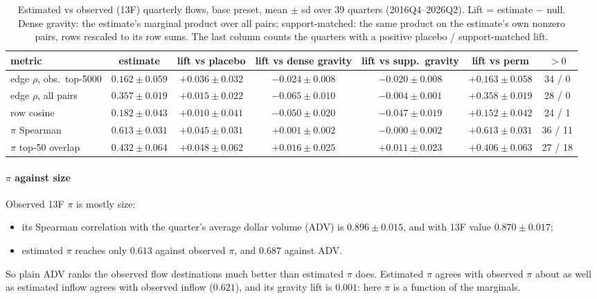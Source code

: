 \documentclass[preprint,3p,twocolumn]{elsarticle}
\begin{document}
\begin{table}[t]
\centering
\caption{Estimated vs observed (13F) quarterly flows, base preset, mean $\pm$ sd over 39 quarters (2016Q4--2026Q2). Lift = estimate $-$ null. Dense gravity: the estimate's marginal product over all pairs; support-matched: the same product on the estimate's own nonzero pairs, rows rescaled to its row sums. The last column counts the quarters with a positive placebo / support-matched lift.}
\label{Table:13f}
\footnotesize\setlength{\tabcolsep}{4pt}
\begin{tabular}{lcccccc}
\toprule
metric & estimate & lift vs placebo & lift vs dense gravity & lift vs supp.\ gravity & lift vs perm & $>0$ \\
\midrule
edge $\rho$, obs.\ top-5000 & $0.162\pm0.059$ & $+0.036\pm0.032$ & $-0.024\pm0.008$ & $-0.020\pm0.008$ & $+0.163\pm0.058$ & 34 / 0 \\
edge $\rho$, all pairs & $0.357\pm0.019$ & $+0.015\pm0.022$ & $-0.065\pm0.010$ & $-0.004\pm0.001$ & $+0.358\pm0.019$ & 28 / 0 \\
row cosine & $0.182\pm0.043$ & $+0.010\pm0.041$ & $-0.050\pm0.020$ & $-0.047\pm0.019$ & $+0.152\pm0.042$ & 24 / 1 \\
$\pi$ Spearman & $0.613\pm0.031$ & $+0.045\pm0.031$ & $+0.001\pm0.002$ & $-0.000\pm0.002$ & $+0.613\pm0.031$ & 36 / 11 \\
$\pi$ top-50 overlap & $0.432\pm0.064$ & $+0.048\pm0.062$ & $+0.016\pm0.025$ & $+0.011\pm0.023$ & $+0.406\pm0.063$ & 27 / 18 \\
\bottomrule
\end{tabular}
\end{table}

\paragraph{$\pi$ against size} Observed 13F $\pi$ is mostly size:
\begin{itemize}
\item its Spearman correlation with the quarter's average dollar volume (ADV) is $0.896\pm0.015$, and with 13F value $0.870\pm0.017$;
\item estimated $\pi$ reaches only $0.613$ against observed $\pi$, and $0.687$ against ADV.
\end{itemize}
So plain ADV ranks the observed flow destinations much better than estimated $\pi$ does. Estimated $\pi$ agrees with observed $\pi$ about as well as estimated inflow agrees with observed inflow ($0.621$), and its gravity lift is $0.001$: here $\pi$ is a function of the marginals.
\end{document}
